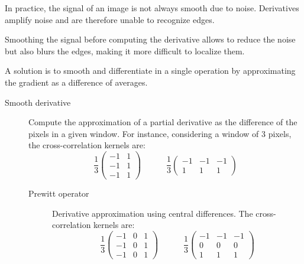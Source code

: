 \begin{remark}
    In practice, the signal of an image is not always smooth due to noise. 
    Derivatives amplify noise and are therefore unable to recognize edges.

    Smoothing the signal before computing the derivative allows to reduce the noise but also blurs the edges, making it more difficult to localize them.

    A solution is to smooth and differentiate in a single operation by approximating the gradient as a difference of averages.
\end{remark}

\begin{description}
    \item[Smooth derivative] 
        Compute the approximation of a partial derivative as the difference of the pixels in a given window.
        For instance, considering a window of 3 pixels, the cross-correlation kernels are:
        \[ \frac{1}{3} \begin{pmatrix} -1 & 1 \\ -1 & 1 \\ -1 & 1 \end{pmatrix} \hspace{3em} \frac{1}{3} \begin{pmatrix} -1 & -1 & -1 \\ 1 & 1 & 1 \end{pmatrix} \]

        \begin{description}
            \item[Prewitt operator] 
                Derivative approximation using central differences.
                The cross-correlation kernels are:
                \[ 
                    \frac{1}{3} \begin{pmatrix} -1 & 0 & 1 \\ -1 & 0 & 1 \\ -1 & 0 & 1 \end{pmatrix} 
                    \hspace{3em} 
                    \frac{1}{3} \begin{pmatrix} -1 & -1 & -1 \\ 0 & 0 & 0 \\ 1 & 1 & 1 \end{pmatrix} 
                \]


\end{description}
\end{description}
